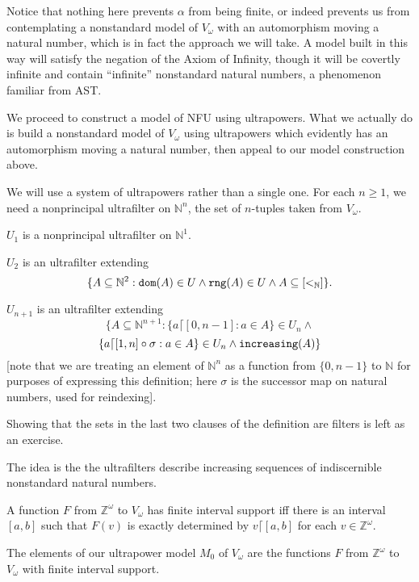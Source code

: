 \documentclass{slides}
\begin{document}
\begin{slide}

Notice that nothing here prevents $\alpha$ from being finite, or indeed prevents us from contemplating a nonstandard model of $V_\omega$ with an automorphism moving a natural number, which is in fact the approach we will take.  A model built in this way will satisfy the negation of the Axiom of Infinity, though it will be covertly infinite and contain ``infinite'' nonstandard natural numbers, a phenomenon familiar from AST.

\end{slide}

\begin{slide}

We proceed to construct a model of NFU using ultrapowers.  What we actually do is build a nonstandard model of $V_\omega$ using ultrapowers which evidently has an automorphism moving a natural number, then appeal to our model construction above.

We will use a system of ultrapowers rather than a single one.  For each $n\geq 1$, we need a nonprincipal ultrafilter
on $\mathbb N^n$, the set of $n$-tuples taken from $V_\omega$.

\end{slide}

\begin{slide}

$U_1$ is a nonprincipal ultrafilter on $\mathbb N^1$.

$U_2$ is an ultrafilter extending $$\{A \subseteq \mathbb N^2:{\tt dom}(A) \in U \wedge {\tt rng}(A) \in U \wedge A \subseteq [<_{\mathbb N}]\}.$$

$U_{n+1}$ is an ultrafilter extending $$\{A \subseteq \mathbb N^{n+1}: \{a\lceil [0,n-1]:a \in A\} \in U_n \wedge $$ $$ \{a \lceil[1,n]\circ \sigma :a \in A\} \in U_n \wedge {\tt increasing}(A)\}$$ [note that we are treating an element of $\mathbb N^n$ as a function from $\{0,n-1\}$ to $\mathbb N$ for purposes of expressing this definition;  here $\sigma$ is the successor map on natural numbers, used for reindexing].

\end{slide}

\begin{slide}

Showing that the sets in the last two clauses of the definition are filters is left as an exercise.

The idea is the the ultrafilters describe increasing sequences of indiscernible nonstandard natural numbers.

A function $F$ from $\mathbb Z^\omega$ to $V_\omega$ has finite interval support iff there is an interval
$[a,b]$ such that $F(v)$ is exactly determined by $v\lceil [a,b]$ for each $v \in \mathbb Z^\omega$.

The elements of our ultrapower model $M_0$ of $V_\omega$ are the functions $F$ from $\mathbb Z^\omega$ to $V_\omega$ with finite interval support.

\end{slide}
\end{document}
